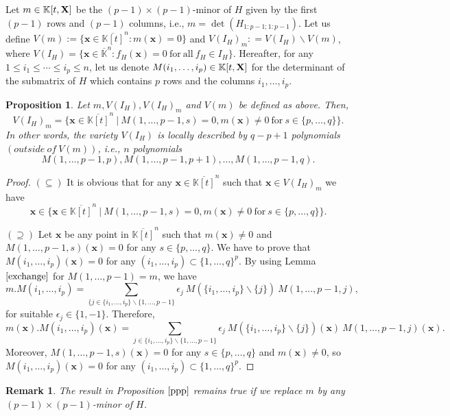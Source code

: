 \documentclass[11pt]{article}
\numberwithin{Property}{section}
\numberwithin{Theorem}{section}
\newtheorem{Proposition}{Proposition}%
\numberwithin{Proposition}{section}
\numberwithin{Lemma}{section}
\numberwithin{Corollary}{section}
\numberwithin{Definition}{section}
\newtheorem{Remark}{Remark}%
\numberwithin{Remark}{section}
\numberwithin{Conjecture}{section}
\numberwithin{Problem}{section}
\numberwithin{Example}{section}
\numberwithin{Claim}{section}
\renewcommand{\leq}{\leqslant}
\def\bar{\overline}
\newcommand{\field}{\mathbb{K}} %
\newcommand{\mat}[1]{\mathbf{\MakeUppercase{#1}}} %
\begin{document}
Let $m \in \field[t,\mat{X}]$ be the $(p-1) \times (p-1)$-minor of $H$ given by the first $(p-1)$ rows and $(p-1)$ columns, i.e., $m = \det(H_{1:p-1;1:p-1})$. Let us define $V(m) := \{\mathbf{x} \in \bar{\field[t]}^n : m(\mathbf{x}) = 0\}$ and $V(I_H)_m : = V(I_H) \backslash V(m)$, where $V(I_H) = \{\mathbf{x} \in \bar{\field}^{n} : f_H(\mathbf{x}) = 0 \ \mathrm{for \ all} \ f_H \in I_H\}$. Hereafter, for any $1 \leq i_1 \leq \cdots \leq i_p \leq n$, let us denote $M(i_1, \ldots, i_p) \in \field[t,\mat{X}]$ for the determinant of the submatrix of $H$ which contains $p$ rows and the columns $i_1, \ldots, i_p$. 
\begin{Proposition} Let $m, V(I_H), V(I_H)_m$ and $V(m)$ be defined as above. Then, 
\[
V(I_H)_m = \{\mathbf{x} \in \bar{\field[t]}^n \ | \ M(1, \ldots, p-1, s) = 0, m(\mathbf{x}) \ne 0 \ \mathrm{for} \ s \in \{p, \ldots, q\} \}.
\] In other words, the variety $V(I_H)$ is locally described by $q - p + 1$ polynomials $(outside \ of \ V(m))$, i.e., $n$ polynomials 
\[
M(1, \ldots, p-1, p), M(1, \ldots, p-1, p+	1), \ldots, M(1, \ldots, p-1, q).
\]
\label{ppp}
\end{Proposition}
\begin{proof}
$(\subseteq)$ It is obvious that for any $\mathbf{x} \in \bar{\field[t]}^n$ such that $\mathbf{x} \in V(I_H)_m$ we have 
\[\mathbf{x} \in \{\mathbf{x} \in \bar{\field[t]}^n \ | \ M(1, \ldots, p-1, s) = 0, m(\mathbf{x}) \ne 0 \ \mathrm{for} \ s \in \{p, \ldots, q\} \}.\]

$(\supseteq)$ Let $\mathbf{x}$ be any point in $\bar{\field[t]}^n$ such that $m(\mathbf{x}) \ne 0$ and $M(1, \ldots, p-1, s)(\mathbf{x}) = 0$ for any $s \in \{p, \ldots, q\}$. We have to prove that $M(i_1, \ldots, i_p)(\mathbf{x}) = 0$ for any $(i_1, \ldots, i_p) \subset \{1, \ldots, q\}^p$. By using Lemma $\ref{exchange}$ for $M(1, \ldots, p-1) = m$, we have 
\[
m.M(i_1, \ldots, i_p) = \sum_{\{j \in \{i_1, \ldots, i_p\} \backslash \{1, \ldots, p-1 \} } \epsilon_j \ M(\{i_1, \ldots, i_p\} \backslash \{j\}) \ M(1, \ldots, p-1,j),
\] for suitable $\epsilon_j \in \{1,-1\}$. Therefore, 
\[
m(\mathbf{x}).M(i_1, \ldots, i_p)(\mathbf{x}) = \sum_{j \in \{i_1, \ldots, i_p\} \backslash \{1, \ldots, p-1 \} } \epsilon_j \ M(\{i_1, \ldots, i_p\} \backslash \{j\})(\mathbf{x}) \ M(1, \ldots, p-1,j)(\mathbf{x}). 
\] Moreover, $M(1, \ldots, p-1, s)(\mathbf{x}) = 0$ for any $s \in \{p, \ldots, q\}$ and $m(\mathbf{x}) \ne 0$, so $M(i_1, \ldots, i_p)(\mathbf{x}) = 0$ for any $(i_1, \ldots, i_p) \subset \{1, \ldots, q\}^p$. 
\end{proof}
\begin{Remark}The result in Proposition $\ref{ppp}$ remains true if we replace $m$ by any $(p-1) \times (p-1)$-minor of $H$. 
\end{Remark}
\end{document}
